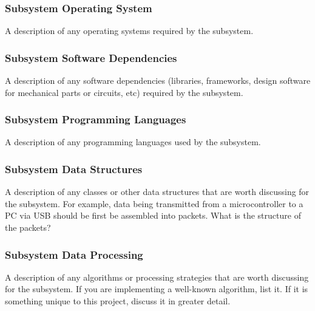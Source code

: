 \subsubsection{Subsystem Operating System}
A description of any operating systems required by the subsystem.

\subsubsection{Subsystem Software Dependencies}
A description of any software dependencies (libraries, frameworks, design software for mechanical parts or circuits, etc) required by the subsystem.

\subsubsection{Subsystem Programming Languages}
A description of any programming languages used by the subsystem.

\subsubsection{Subsystem Data Structures}
A description of any classes or other data structures that are worth discussing for the subsystem. For example, data being transmitted from a microcontroller to a PC via USB should be first be assembled into packets. What is the structure of the packets?

\subsubsection{Subsystem Data Processing}
A description of any algorithms or processing strategies that are worth discussing for the subsystem. If you are implementing a well-known algorithm, list it. If it is something unique to this project, discuss it in greater detail.